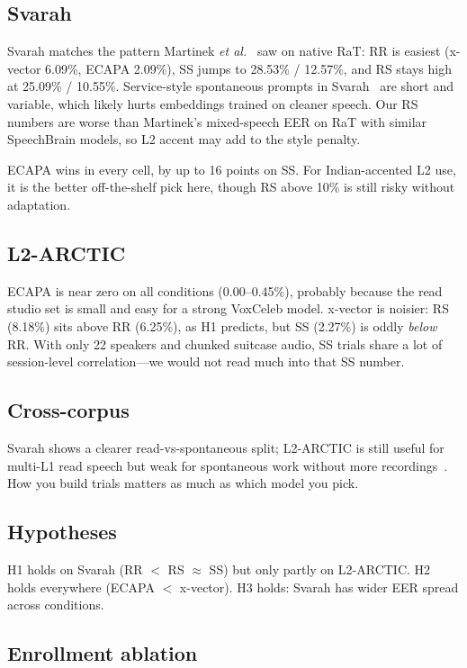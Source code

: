 \documentclass[cameraready]{Interspeech}
\begin{document}
\subsection{Svarah}

Svarah matches the pattern Martinek \textit{et al.}~\cite{martinek2025read} saw on native RaT: RR is easiest (x-vector 6.09\%, ECAPA 2.09\%), SS jumps to 28.53\% / 12.57\%, and RS stays high at 25.09\% / 10.55\%. Service-style spontaneous prompts in Svarah~\cite{javed2023svarah} are short and variable, which likely hurts embeddings trained on cleaner speech. Our RS numbers are worse than Martinek's mixed-speech EER on RaT with similar SpeechBrain models, so L2 accent may add to the style penalty.

ECAPA wins in every cell, by up to 16 points on SS. For Indian-accented L2 use, it is the better off-the-shelf pick here, though RS above 10\% is still risky without adaptation.

\subsection{L2-ARCTIC}

ECAPA is near zero on all conditions (0.00--0.45\%), probably because the read studio set is small and easy for a strong VoxCeleb model. x-vector is noisier: RS (8.18\%) sits above RR (6.25\%), as H1 predicts, but SS (2.27\%) is oddly \emph{below} RR. With only 22 speakers and chunked suitcase audio, SS trials share a lot of session-level correlation---we would not read much into that SS number.

\subsection{Cross-corpus}

Svarah shows a clearer read-vs-spontaneous split; L2-ARCTIC is still useful for multi-L1 read speech but weak for spontaneous work without more recordings~\cite{zhao2018l2arctic}. How you build trials matters as much as which model you pick.

\subsection{Hypotheses}

H1 holds on Svarah (RR $<$ RS $\approx$ SS) but only partly on L2-ARCTIC. H2 holds everywhere (ECAPA $<$ x-vector). H3 holds: Svarah has wider EER spread across conditions.

\subsection{Enrollment ablation}
\end{document}
